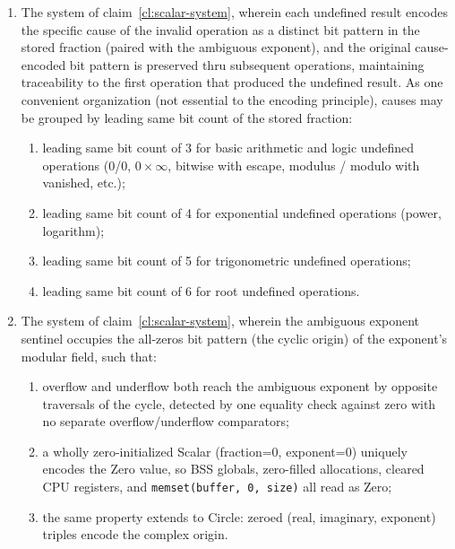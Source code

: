 \documentclass[12pt,letter]{article}
\begin{document}
\begin{enumerate}
    \item The system of claim~\ref{cl:scalar-system}, wherein each undefined result encodes the specific cause of the invalid operation as a distinct bit pattern in the stored fraction (paired with the ambiguous exponent), and the original cause-encoded bit pattern is preserved thru subsequent operations, maintaining traceability to the first operation that produced the undefined result. As one convenient organization (not essential to the encoding principle), causes may be grouped by leading same bit count of the stored fraction:
          \begin{enumerate}
              \item leading same bit count of 3 for basic arithmetic and logic undefined operations (0/0, $0 \times \infty$, bitwise with escape, modulus / modulo with vanished, etc.);
              \item leading same bit count of 4 for exponential undefined operations (power, logarithm);
              \item leading same bit count of 5 for trigonometric undefined operations;
              \item leading same bit count of 6 for root undefined operations.
          \end{enumerate}

    \item The system of claim~\ref{cl:scalar-system}, wherein the ambiguous exponent sentinel occupies the all-zeros bit pattern (the cyclic origin) of the exponent's modular field, such that:
          \begin{enumerate}
              \item overflow and underflow both reach the ambiguous exponent by opposite traversals of the cycle, detected by one equality check against zero with no separate overflow/underflow comparators;
              \item a wholly zero-initialized Scalar (fraction=0, exponent=0) uniquely encodes the Zero value, so BSS globals, zero-filled allocations, cleared CPU registers, and \texttt{memset(buffer, 0, size)} all read as Zero;
              \item the same property extends to Circle: zeroed (real, imaginary, exponent) triples encode the complex origin.
          \end{enumerate}


\end{enumerate}
\end{document}
